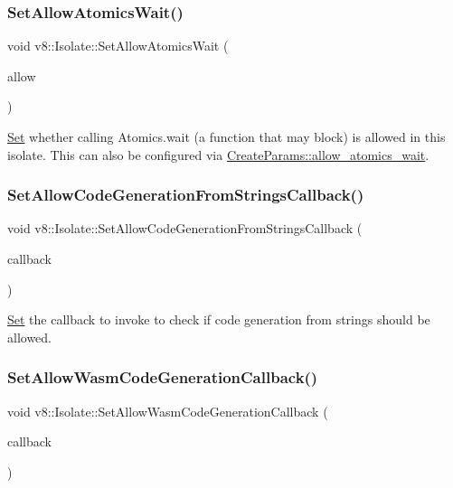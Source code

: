 \subsubsection{\texorpdfstring{Set\+Allow\+Atomics\+Wait()}{SetAllowAtomicsWait()}}
{\footnotesize\ttfamily void v8\+::\+Isolate\+::\+Set\+Allow\+Atomics\+Wait (\begin{DoxyParamCaption}\item[{bool}]{allow }\end{DoxyParamCaption})}

\mbox{\hyperlink{classv8_1_1Set}{Set}} whether calling Atomics.\+wait (a function that may block) is allowed in this isolate. This can also be configured via \mbox{\hyperlink{structv8_1_1Isolate_1_1CreateParams_acade19de0f78ff15d76aaef2e292da72}{Create\+Params\+::allow\+\_\+atomics\+\_\+wait}}. \mbox{\label{classv8_1_1Isolate_ad91199faf0a599c69539af01f5df44e9}} 
\subsubsection{\texorpdfstring{Set\+Allow\+Code\+Generation\+From\+Strings\+Callback()}{SetAllowCodeGenerationFromStringsCallback()}}
{\footnotesize\ttfamily void v8\+::\+Isolate\+::\+Set\+Allow\+Code\+Generation\+From\+Strings\+Callback (\begin{DoxyParamCaption}\item[{\mbox{\hyperlink{namespacev8_ab2c5378d97ebe2885b300fe0bcd3f89c}{Allow\+Code\+Generation\+From\+Strings\+Callback}}}]{callback }\end{DoxyParamCaption})}

\mbox{\hyperlink{classv8_1_1Set}{Set}} the callback to invoke to check if code generation from strings should be allowed. \mbox{\label{classv8_1_1Isolate_a0cac332e61544be1271ceb784078b2fe}} 
\subsubsection{\texorpdfstring{Set\+Allow\+Wasm\+Code\+Generation\+Callback()}{SetAllowWasmCodeGenerationCallback()}}
{\footnotesize\ttfamily void v8\+::\+Isolate\+::\+Set\+Allow\+Wasm\+Code\+Generation\+Callback (\begin{DoxyParamCaption}\item[{Allow\+Wasm\+Code\+Generation\+Callback}]{callback }\end{DoxyParamCaption})}

